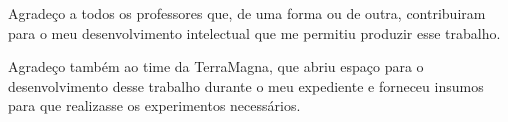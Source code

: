 Agradeço a todos os professores que, de uma forma ou de outra, contribuiram para o meu
desenvolvimento intelectual que me permitiu produzir esse trabalho.

Agradeço também ao time da TerraMagna, que abriu espaço para o desenvolvimento desse
trabalho durante o meu expediente e forneceu insumos para que realizasse os experimentos
necessários.
